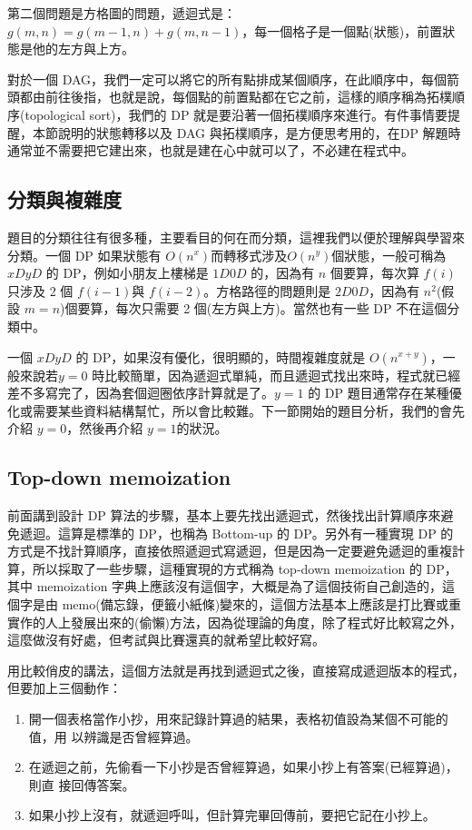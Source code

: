 \documentclass[a4paper, 11pt, oneside]{book}
\begin{document}
第二個問題是方格圖的問題，遞迴式是：$g(m,n)=g(m-1,n)+g(m,n-1)$，每一個格子是一個點(狀態)，前置狀態是他的左方與上方。

對於一個 DAG，我們一定可以將它的所有點排成某個順序，在此順序中，每個箭頭都由前往後指，也就是說，每個點的前置點都在它之前，這樣的順序稱為拓樸順序(topological sort)，我們的 DP 就是要沿著一個拓樸順序來進行。有件事情要提醒，本節說明的狀態轉移以及 DAG 與拓樸順序，是方便思考用的，在DP 解題時通常並不需要把它建出來，也就是建在心中就可以了，不必建在程式中。

\subsection{分類與複雜度}
題目的分類往往有很多種，主要看目的何在而分類，這裡我們以便於理解與學習來分類。一個 DP 如果狀態有 $O(n^x)$而轉移式涉及$O(n^y)$個狀態，一般可稱為 $xDyD$ 的 DP，例如小朋友上樓梯是 $1D0D$ 的，因為有 $n$ 個要算，每次算 $f(i)$只涉及 2 個 $f(i-1)$與 $f(i-2)$。方格路徑的問題則是 $2D0D$，因為有 $n^2$(假設 $m=n$)個要算，每次只需要 2 個(左方與上方)。當然也有一些 DP 不在這個分類中。

一個 $xDyD$ 的 DP，如果沒有優化，很明顯的，時間複雜度就是 $O(n^{x+y})$，一般來說若$y=0$ 時比較簡單，因為遞迴式單純，而且遞迴式找出來時，程式就已經差不多寫完了，因為套個迴圈依序計算就是了。$y=1$ 的 DP 題目通常存在某種優化或需要某些資料結構幫忙，所以會比較難。下一節開始的題目分析，我們的會先介紹 $y=0$，然後再介紹 $y=1$的狀況。

\subsection{Top-down memoization}
前面講到設計 DP 算法的步驟，基本上要先找出遞迴式，然後找出計算順序來避免遞迴。這算是標準的 DP，也稱為 Bottom-up 的 DP。另外有一種實現 DP 的方式是不找計算順序，直接依照遞迴式寫遞迴，但是因為一定要避免遞迴的重複計算，所以採取了一些步驟，這種實現的方式稱為 top-down memoization 的 DP，其中 memoization 字典上應該沒有這個字，大概是為了這個技術自己創造的，這個字是由 memo(備忘錄，便籤小紙條)變來的，這個方法基本上應該是打比賽或重實作的人上發展出來的(偷懶)方法，因為從理論的角度，除了程式好比較寫之外，這麼做沒有好處，但考試與比賽還真的就希望比較好寫。

用比較俏皮的講法，這個方法就是再找到遞迴式之後，直接寫成遞迴版本的程式，但要加上三個動作：

\begin{enumerate}
    \item 開一個表格當作小抄，用來記錄計算過的結果，表格初值設為某個不可能的值，用
          以辨識是否曾經算過。
    \item 在遞迴之前，先偷看一下小抄是否曾經算過，如果小抄上有答案(已經算過)，則直
          接回傳答案。
    \item 如果小抄上沒有，就遞迴呼叫，但計算完畢回傳前，要把它記在小抄上。
\end{enumerate}
\end{document}
